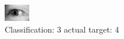 \begin{figure}[h!]
\begin{center}
\includegraphics[width=0.60\columnwidth]{figures/ID3143_class_3_target_4.png}
\end{center}
\caption{ Classification: 3 actual target: 4}
\label{fig:ID3143_class_3_target_4}
\end{figure}
